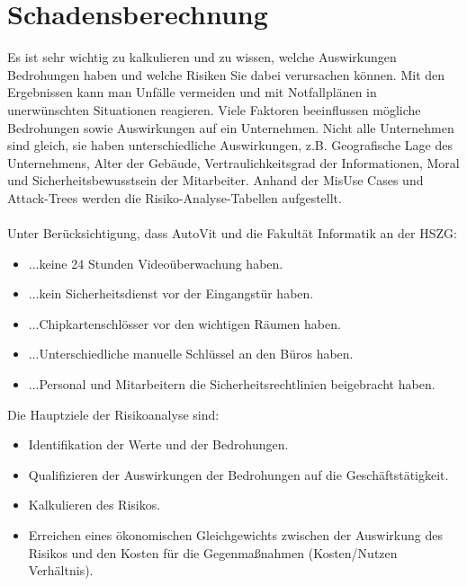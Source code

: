 \section{Schadensberechnung}
Es ist sehr wichtig zu kalkulieren und zu wissen, welche Auswirkungen Bedrohungen haben und welche Risiken Sie dabei verursachen können. Mit den Ergebnissen kann man Unfälle vermeiden und mit Notfallplänen in unerwünschten Situationen reagieren. Viele Faktoren beeinflussen mögliche Bedrohungen sowie Auswirkungen auf ein Unternehmen. Nicht alle Unternehmen sind gleich, sie haben unterschiedliche Auswirkungen, z.B. Geografische Lage des Unternehmens, Alter der Gebäude, Vertraulichkeitsgrad der Informationen, Moral und Sicherheitsbewusstsein der Mitarbeiter. Anhand der MisUse Cases und Attack-Trees werden die Risiko-Analyse-Tabellen  aufgestellt.
\\
\\
Unter Berücksichtigung, dass AutoVit und die Fakultät Informatik an der HSZG:
\begin{itemize}
\item ...keine 24 Stunden Videoüberwachung haben.
\item ...kein Sicherheitsdienst vor der Eingangstür haben.
\item ...Chipkartenschlösser vor den wichtigen Räumen haben.
\item ...Unterschiedliche manuelle Schlüssel an den Büros haben.
\item ...Personal und Mitarbeitern die Sicherheitsrechtlinien beigebracht haben.
\end{itemize}

Die Hauptziele der Risikoanalyse sind:
\begin{itemize}
\item Identifikation der Werte und der Bedrohungen.
\item Qualifizieren der Auswirkungen der Bedrohungen auf die Geschäftstätigkeit.
\item Kalkulieren des Risikos.
\item Erreichen eines ökonomischen Gleichgewichts zwischen der Auswirkung des Risikos und den Kosten für die Gegenmaßnahmen (Kosten/Nutzen Verhältnis).
\end{itemize}


